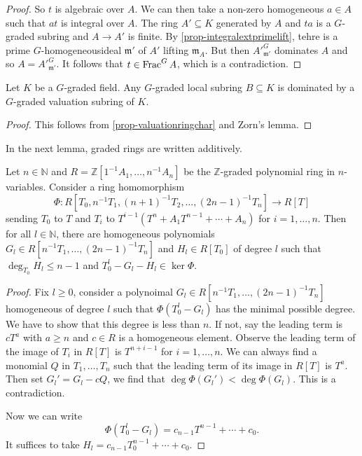 \begin{proof}
    So $t$ is algebraic over $A$. We can then take a non-zero homogeneous $a\in A$ such that $at$ is integral over $A$. The ring $A'\subseteq K$ generated by $A$ and $ta$ is a $G$-graded subring and $A\rightarrow A'$ is finite. By \cref{prop-integralextprimelift}, tehre is a prime $G$-homogeneousideal $\mathfrak{m}'$ of $A'$ lifting $\mathfrak{m}_A$. But then $A'^G_{\mathfrak{m}'}$ dominates $A$ and so $A=A'^G_{\mathfrak{m}'}$. It follows that $t\in \operatorname{Frac}^G A$, which is a contradiction.
\end{proof}

\begin{corollary}\label{cor-localringdominatedbyvaluationring}
    Let $K$ be a $G$-graded field. Any $G$-graded local subring $B\subseteq K$ is dominated by a $G$-graded valuation subring of $K$.
\end{corollary}
\begin{proof}
    This follows from \cref{prop-valuationringchar} and Zorn's lemma.
\end{proof}

In the next lemma, graded rings are written additively.
\begin{lemma}\label{lma-gradedhomokernel}
    Let $n\in \mathbb{N}$ and $R=\mathbb{Z}[1^{-1}A_1,\ldots,n^{-1}A_n]$ be the $\mathbb{Z}$-graded polynomial ring in $n$-variables. Consider a ring homomorphism
    \[
        \Phi:R[T_0,n^{-1}T_1,(n+1)^{-1}T_2,\ldots,(2n-1)^{-1}T_n]\rightarrow R[T]  
    \]
    sending $T_0$ to $T$ and $T_i$ to $T^{i-1}(T^n+A_1 T^{n-1}+\cdots+A_n)$ for $i=1,\ldots,n$. Then for all $l\in \mathbb{N}$, there are homogeneous polynomials $G_l\in R[n^{-1}T_1,\ldots,(2n-1)^{-1}T_n]$ and $H_l\in R[T_0]$ of degree $l$ such that $\deg_{T_0}H_l\leq n-1$ and $T_0^l-G_l-H_l\in \ker \Phi$.
\end{lemma}
\begin{proof}
    Fix $l\geq 0$, consider a polynoimal $G_l\in R[n^{-1}T_1,\ldots,(2n-1)^{-1}T_n]$ homogeneous of degree $l$ such that $\Phi(T_0^l-G_l)$ has the minimal possible degree. We have to show that this degree is less than $n$. If not, say the leading term is $cT^a$ with $a\geq n$ and $c\in R$ is a homogeneous element. Observe the leading term of the image of $T_i$ in $R[T]$ is $T^{n+i-1}$ for $i=1,\ldots,n$. We can always find a monomial $Q$ in $T_1,\ldots,T_n$ such that the leading term of its image in $R[T]$ is $T^a$. Then set $G_l'=G_l-cQ$, we find that $\deg\Phi(G_l')<\deg \Phi(G_l)$. This is a contradiction.
    
    Now we can write
    \[
        \Phi(T_0^l-G_l)=c_{n-1}T^{n-1}+\cdots+c_0.  
    \]
    It suffices to take $H_l=c_{n-1}T_0^{n-1}+\cdots+c_0$.
\end{proof}


